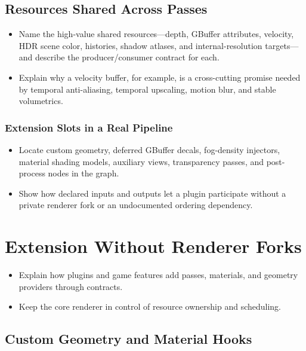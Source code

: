 \documentclass[
  11pt,
  letterpaper,
  DIV=11,
  numbers=noendperiod,
  twoside,
  open=right]{scrreprt}
\providecommand{\tightlist}{%
  \setlength{\itemsep}{0pt}\setlength{\parskip}{0pt}}
\begin{document}
\subsection{Resources Shared Across
Passes}\label{resources-shared-across-passes}

\begin{itemize}
\tightlist
\item
  Name the high-value shared resources---depth, GBuffer attributes,
  velocity, HDR scene color, histories, shadow atlases, and
  internal-resolution targets---and describe the producer/consumer
  contract for each.
\item
  Explain why a velocity buffer, for example, is a cross-cutting promise
  needed by temporal anti-aliasing, temporal upscaling, motion blur, and
  stable volumetrics.
\end{itemize}

\subsubsection{Extension Slots in a Real
Pipeline}\label{extension-slots-in-a-real-pipeline}

\begin{itemize}
\tightlist
\item
  Locate custom geometry, deferred GBuffer decals, fog-density
  injectors, material shading models, auxiliary views, transparency
  passes, and post-process nodes in the graph.
\item
  Show how declared inputs and outputs let a plugin participate without
  a private renderer fork or an undocumented ordering dependency.
\end{itemize}

\section{Extension Without Renderer
Forks}\label{extension-without-renderer-forks}

\begin{itemize}
\tightlist
\item
  Explain how plugins and game features add passes, materials, and
  geometry providers through contracts.
\item
  Keep the core renderer in control of resource ownership and
  scheduling.
\end{itemize}

\subsection{Custom Geometry and Material
Hooks}\label{custom-geometry-and-material-hooks}
\end{document}
